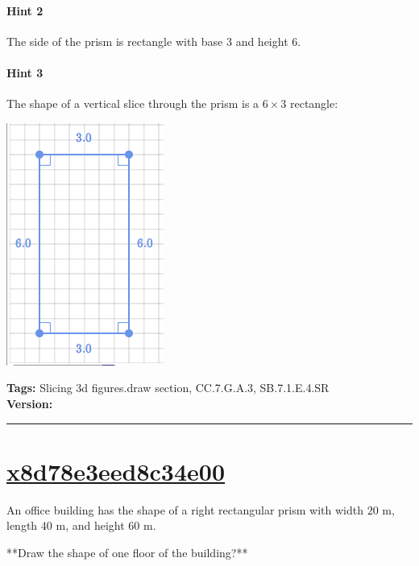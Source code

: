 \documentclass[twocolumn,10pt]{article}
\def\shrinkfactor{0.4}
\begin{document}
\paragraph{Hint 2}The side of the prism is rectangle with base $3$ and height $6$.

\paragraph{Hint 3}The shape of a vertical slice through the prism is a $6 \times 3$ rectangle:  

\includegraphics[scale=\shrinkfactor]{figures/8697a53b06e869ea09df9f318b41e82e0f50c94e.png}



\medskip
\noindent
\textbf{Tags:} {\footnotesize Slicing 3d figures.draw section, CC.7.G.A.3, SB.7.1.E.4.SR}\\
\textbf{Version:} \DIFdelbegin {}\DIFdelend \DIFaddbegin {}\DIFaddend \smallskip\hrule





\section{\href{https://www.khanacademy.org/devadmin/content/items/x8d78e3eed8c34e00}{x8d78e3eed8c34e00}}

\noindent
An office building has the shape of a right rectangular prism with width $20\text{ m}$, length $40\text{ m}$, and height $60\text{ m}$.

**Draw the shape of one floor of the building?**
\end{document}
